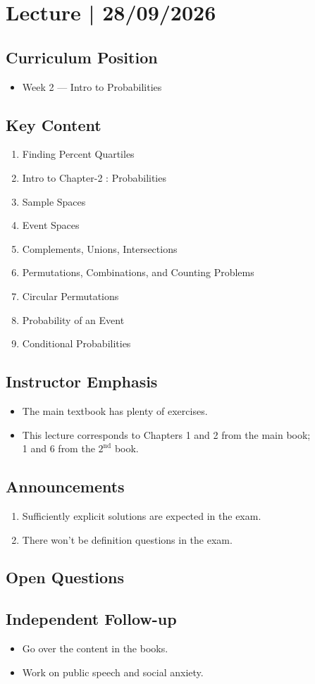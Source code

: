 \section{Lecture | 28/09/2026}


\subsection*{Curriculum Position}
\begin{itemize}
	\item Week 2 — Intro to Probabilities 
\end{itemize}


\subsection*{Key Content}
\begin{enumerate}
	\item Finding Percent Quartiles
	\item Intro to Chapter-2 : Probabilities  
	\item Sample Spaces 
	\item Event Spaces 
	\item Complements, Unions, Intersections
	\item Permutations, Combinations, and Counting Problems
	\item Circular Permutations
	\item Probability of an Event
	\item Conditional Probabilities
\end{enumerate}


\subsection*{Instructor Emphasis}
\begin{itemize}
	\item The main textbook has plenty of exercises.
	\item This lecture corresponds to Chapters 1 and 2 from the main book; \\
	1 and 6 from the $ 2^{\text{nd}} $ book.
\end{itemize} 


\subsection*{Announcements}
\begin{enumerate}
	\item Sufficiently explicit solutions are expected in the exam. 
	\item There won't be definition questions in the exam. 
\end{enumerate}



\subsection*{Open Questions}
\subsection*{Independent Follow-up}
\begin{itemize}
	\item Go over the content in the books.
	\item Work on public speech and social anxiety. 
	
\end{itemize}
